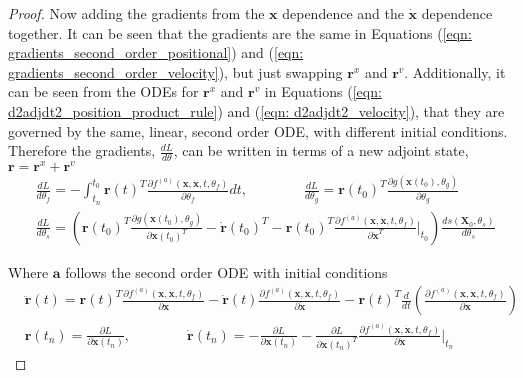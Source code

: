 \documentclass{article}
\theoremstyle{remark}
\theoremstyle{definition}
\begin{document}
\begin{proof}
Now adding the gradients from the $\mathbf{x}$ dependence and the $\dot{\mathbf{x}}$ dependence together. It can be seen that the gradients are the same in Equations (\ref{eqn: gradients_second_order_positional}) and (\ref{eqn: gradients_second_order_velocity}), but just swapping $\mathbf{r}^{x}$ and $\mathbf{r}^{v}$. Additionally, it can be seen from the ODEs for $\mathbf{r}^{x}$ and $\mathbf{r}^{v}$ in Equations (\ref{eqn: d2adjdt2_position_product_rule}) and (\ref{eqn: d2adjdt2_velocity}), that they are governed by the same, linear, second order ODE, with different initial conditions. Therefore the gradients, $\displaystyle  \frac{dL}{d\theta}$, can be written in terms of a new adjoint state, $\mathbf{r} = \mathbf{r}^{x}+\mathbf{r}^{v}$
\begin{equation}
\label{eqn: gradients_from_second_order_method_final}
\begin{aligned}
&\frac{dL}{d\theta_{f}} = -\int_{t_{n}}^{t_{0}}\mathbf{r}(t)^{T}\frac{\partial f^{(a)}(\mathbf{x}, \dot{\mathbf{x}}, t, \theta_{f})}{\partial \theta_{f}}dt
,\qquad\qquad
\frac{dL}{d\theta_{g}} = \mathbf{r}(t_{0})^{T}\frac{\partial g(\mathbf{x}(t_{0}), \theta_{g})}{\partial \theta_{g}}
\\
&\frac{dL}{d\theta_{s}} = \left(
\mathbf{r}(t_{0})^{T}\frac{\partial g(\mathbf{x}(t_{0}), \theta_{g})}{\partial \mathbf{x}(t_{0})^{T}}
- \dot{\mathbf{r}}(t_{0})^{T} -\mathbf{r}(t_{0})^{T}
\frac{\partial f^{(a)}(\mathbf{x}, \dot{\mathbf{x}}, t, \theta_{f})}{\partial \dot{\mathbf{x}}^{T}}\Biggr\vert_{t_{0}}
\right)\frac{ds(\mathbf{X}_{0}, \theta_{s})}{d\theta_{s}}
\end{aligned}
\end{equation}

Where $\mathbf{a}$ follows the second order ODE with initial conditions
\begin{equation}
\label{eqn: adjoint_ode_initial_conditions_second_order_final}
\begin{aligned}
    &\ddot{\mathbf{r}}(t) = \mathbf{r}(t)^{T}\frac{\partial f^{(a)}(\mathbf{x}, \dot{\mathbf{x}}, t, \theta_{f})}{\partial \mathbf{x}}
    -\dot{\mathbf{r}}(t)\frac{\partial f^{(a)}(\mathbf{x}, \dot{\mathbf{x}}, t, \theta_{f})}{\partial \dot{\mathbf{x}}}
    - \mathbf{r}(t)^{T}\frac{d}{dt}\left(
    \frac{\partial f^{(a)}(\mathbf{x}, \dot{\mathbf{x}}, t, \theta_{f})}{\partial \dot{\mathbf{x}}}
    \right)
    \\
    &\mathbf{r}(t_{n}) = \frac{\partial L}{\partial \dot{\mathbf{x}}(t_{n})}
    ,\qquad\qquad
    \dot{\mathbf{r}}(t_{n}) = -\frac{\partial L}{\partial \mathbf{x}(t_{n})} -\frac{\partial L}{\partial \dot{\mathbf{x}}(t_{n})^{T}}
    \frac{\partial f^{(a)}(\mathbf{x}, \dot{\mathbf{x}}, t, \theta_{f})}{\partial \dot{\mathbf{x}}}\Biggr\vert_{t_{n}}
\end{aligned}
\end{equation}


\end{proof}
\end{document}
